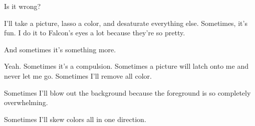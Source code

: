 \begin{paracol}{2}
\begin{leftcolumn}
\begin{ally}
Is it wrong?
\end{ally}

I'll take a picture, lasso a color, and desaturate everything else. Sometimes, it's fun. I do it to Falcon's eyes a lot because they're so pretty.

\begin{ally}
And sometimes it's something more.
\end{ally}
Yeah. Sometimes it's a compulsion. Sometimes a picture will latch onto me and never let me go. Sometimes I'll remove all color.




\newpage

Sometimes I'll blow out the background because the foreground is so completely overwhelming.
\end{leftcolumn}
\end{paracol}
\vfill


\vfill
\newpage

Sometimes I'll skew colors all in one direction.
\vfill


\vfill
\newpage

